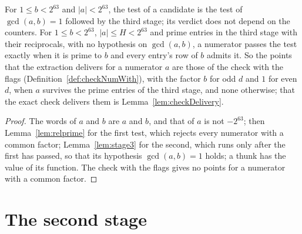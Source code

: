 \begin{lemma}\label{lem:accepted}
  \leanok
  For $1 \le b < 2^{63}$ and $|a| < 2^{63}$, the test of a candidate is the test of $\gcd(a, b) = 1$
  followed by the third stage; its verdict does not depend on the counters. For $1 \le b < 2^{63}$,
  $|a| \le H < 2^{63}$ and prime entries in the third stage with their reciprocals, with no
  hypothesis on $\gcd(a, b)$, a numerator passes the test exactly when it is prime to $b$ and every
  entry's row of $b$ admits it. So the points that the extraction delivers for a numerator $a$ are
  those of the check with the flags (Definition~\ref{def:checkNumWith}), with the factor $b$ for odd
  $d$ and $1$ for even $d$, when $a$ survives the prime entries of the third stage, and none
  otherwise; that the exact check delivers them is Lemma~\ref{lem:checkDelivery}.
\end{lemma}

\begin{proof}
  \leanok
  The words of $a$ and $b$ are $a$ and $b$, and that of $a$ is not $-2^{63}$; then
  Lemma~\ref{lem:relprime} for the first test, which rejects every numerator with a common factor;
  Lemma~\ref{lem:stage3} for the second, which runs only after the first has passed, so that its
  hypothesis $\gcd(a, b) = 1$ holds; a thunk has the value of its function. The check with the flags
  gives no points for a numerator with a common factor.
\end{proof}

\section{The second stage}\label{sec:secondStage}

